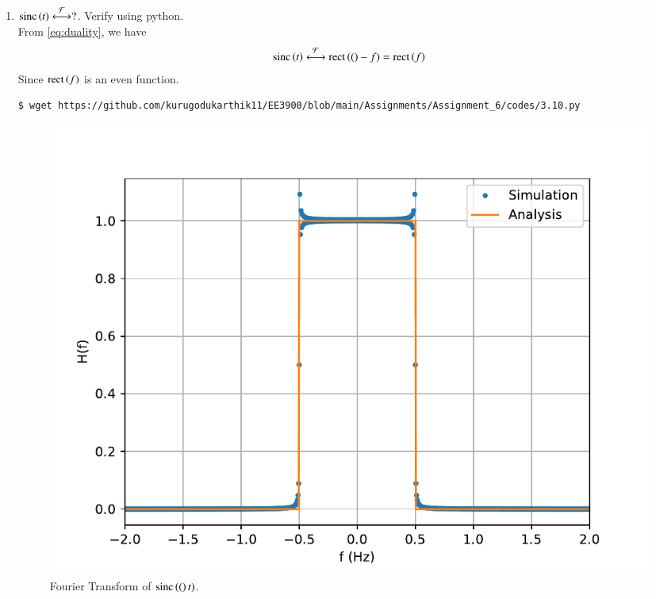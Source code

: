 \documentclass[journal,12pt,twocolumn]{IEEEtran}
\renewcommand\thesection{\arabic{section}}
\begin{document}
\begin{enumerate}[label=\thesection.\arabic*
,ref=\thesection.\theenumi]
\item
$     \text{sinc}\left(t\right)\overset{\mathcal{F}}{ \longleftrightarrow} ?$. Verify using python.\\
\solution From \eqref{eq:duality}, we have
\begin{align}
\text{sinc}\left(t\right)\overset{\mathcal{F}}{ \longleftrightarrow}\text{rect}\left((\right)-f)=\text{rect}\left(f\right)
\label{eq:fourier-sinc}
\end{align}
Since $\text{rect}\left(f\right)$ is an even function.
\begin{lstlisting}
$ wget https://github.com/kurugodukarthik11/EE3900/blob/main/Assignments/Assignment_6/codes/3.10.py
\end{lstlisting}
\begin{figure}[!ht]
\includegraphics[width=\columnwidth]{figs/3.10.pdf}
\caption{Fourier Transform of $\text{sinc}\left((\right)t)$.}
\label{eq:fig-fourier-sinc}
\end{figure}
\end{enumerate}
\end{document}
